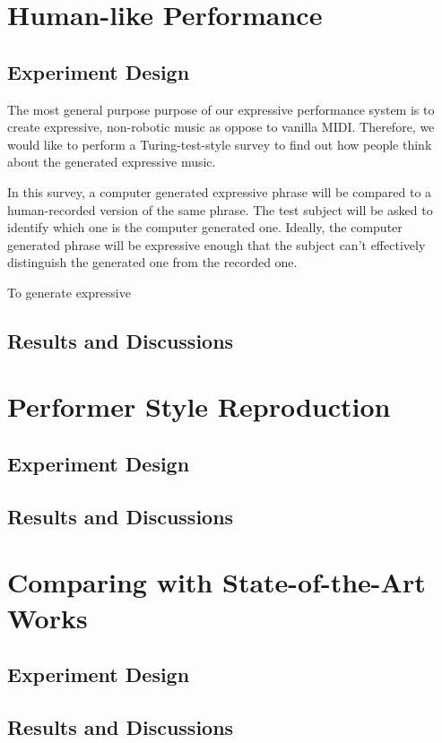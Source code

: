\section{Human-like Performance}
\subsection{Experiment Design}
The most general purpose purpose of our expressive performance system is to create expressive, non-robotic music as oppose to vanilla MIDI. Therefore, we would like to perform a Turing-test-style survey to find out how people think about the generated expressive music.

In this survey, a computer generated expressive phrase will be compared to a human-recorded version of the same phrase. The test subject will be asked to identify which one is the computer generated one. Ideally, the computer generated phrase will be expressive enough that the subject can't effectively distinguish the generated one from the recorded one.

To generate expressive 


\subsection{Results and Discussions}

\section{Performer Style Reproduction}
\subsection{Experiment Design}

\subsection{Results and Discussions}
\section{Comparing with State-of-the-Art Works}
\subsection{Experiment Design}
\subsection{Results and Discussions}
